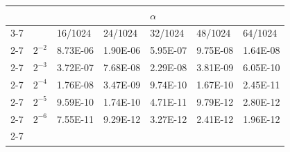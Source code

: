 \begin{table}[]
\centering
\begin{tabular}{lllllll}
                                &                               &                                                       &                                                       & $\alpha$                                              &                                                       &                                                       \\ \cline{3-7} 
                                & \multicolumn{1}{l|}{}         & \multicolumn{1}{l|}{16/1024}                          & \multicolumn{1}{l|}{24/1024}                          & \multicolumn{1}{l|}{32/1024}                          & \multicolumn{1}{l|}{48/1024}                          & \multicolumn{1}{l|}{64/1024}                          \\ \cline{2-7} 
\multicolumn{1}{l|}{}           & \multicolumn{1}{l|}{$2^{-2}$} & \multicolumn{1}{l|}{\cellcolor[HTML]{C0C0C0}8.73E-06} & \multicolumn{1}{l|}{\cellcolor[HTML]{C0C0C0}1.90E-06} & \multicolumn{1}{l|}{\cellcolor[HTML]{C0C0C0}5.95E-07} & \multicolumn{1}{l|}{\cellcolor[HTML]{C0C0C0}9.75E-08} & \multicolumn{1}{l|}{\cellcolor[HTML]{C0C0C0}1.64E-08} \\ \cline{2-7} 
\multicolumn{1}{l|}{}           & \multicolumn{1}{l|}{$2^{-3}$} & \multicolumn{1}{l|}{\cellcolor[HTML]{FFFFFF}3.72E-07} & \multicolumn{1}{l|}{\cellcolor[HTML]{FFFFFF}7.68E-08} & \multicolumn{1}{l|}{\cellcolor[HTML]{FFFFFF}2.29E-08} & \multicolumn{1}{l|}{\cellcolor[HTML]{FFFFFF}3.81E-09} & \multicolumn{1}{l|}{\cellcolor[HTML]{FFFFFF}6.05E-10} \\ \cline{2-7} 
\multicolumn{1}{l|}{}           & \multicolumn{1}{l|}{$2^{-4}$} & \multicolumn{1}{l|}{\cellcolor[HTML]{C0C0C0}1.76E-08} & \multicolumn{1}{l|}{\cellcolor[HTML]{C0C0C0}3.47E-09} & \multicolumn{1}{l|}{\cellcolor[HTML]{C0C0C0}9.74E-10} & \multicolumn{1}{l|}{\cellcolor[HTML]{C0C0C0}1.67E-10} & \multicolumn{1}{l|}{\cellcolor[HTML]{C0C0C0}2.45E-11} \\ \cline{2-7} 
\multicolumn{1}{l|}{$\Delta t$} & \multicolumn{1}{l|}{$2^{-5}$} & \multicolumn{1}{l|}{\cellcolor[HTML]{FFFFFF}9.59E-10} & \multicolumn{1}{l|}{\cellcolor[HTML]{FFFFFF}1.74E-10} & \multicolumn{1}{l|}{\cellcolor[HTML]{FFFFFF}4.71E-11} & \multicolumn{1}{l|}{\cellcolor[HTML]{FFFFFF}9.79E-12} & \multicolumn{1}{l|}{\cellcolor[HTML]{FFFFFF}2.80E-12} \\ \cline{2-7} 
\multicolumn{1}{l|}{}           & \multicolumn{1}{l|}{$2^{-6}$} & \multicolumn{1}{l|}{\cellcolor[HTML]{C0C0C0}7.55E-11} & \multicolumn{1}{l|}{\cellcolor[HTML]{C0C0C0}9.29E-12} & \multicolumn{1}{l|}{\cellcolor[HTML]{C0C0C0}3.27E-12} & \multicolumn{1}{l|}{\cellcolor[HTML]{C0C0C0}2.41E-12} & \multicolumn{1}{l|}{\cellcolor[HTML]{C0C0C0}1.96E-12} \\ \cline{2-7} 

\end{tabular}
\end{table}
